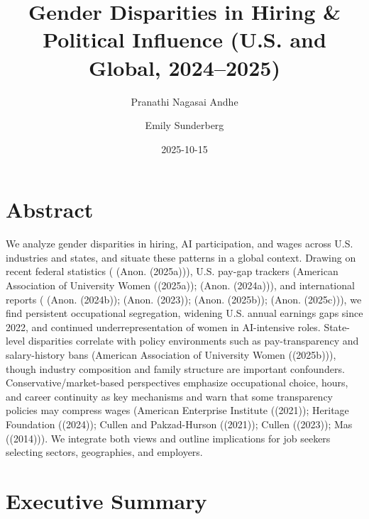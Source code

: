 \documentclass[
  letterpaper,
  DIV=11,
  numbers=noendperiod]{scrartcl}
\title{Gender Disparities in Hiring \& Political Influence (U.S. and
Global, 2024--2025)}
\author{Pranathi Nagasai Andhe \and Emily Sunderberg}
\date{2025-10-15}
\renewcommand*\contentsname{Table of contents}
\newcommand\contentsname{Table of contents}
\begin{document}
\maketitle

\renewcommand*\contentsname{Table of contents}
{
\hypersetup{linkcolor=}
\setcounter{tocdepth}{3}
\tableofcontents
}
\section{Abstract}\label{abstract}

We analyze gender disparities in hiring, AI participation, and wages
across U.S. industries and states, and situate these patterns in a
global context. Drawing on recent federal statistics ( (Anon. (2025a))),
U.S. pay-gap trackers (American Association of University Women
((2025a)); (Anon. (2024a))), and international reports ( (Anon.
(2024b)); (Anon. (2023)); (Anon. (2025b)); (Anon. (2025c))), we find
persistent occupational segregation, widening U.S. annual earnings gaps
since 2022, and continued underrepresentation of women in AI-intensive
roles. State-level disparities correlate with policy environments such
as pay-transparency and salary-history bans (American Association of
University Women ((2025b))), though industry composition and family
structure are important confounders. Conservative/market-based
perspectives emphasize occupational choice, hours, and career continuity
as key mechanisms and warn that some transparency policies may compress
wages (American Enterprise Institute ((2021)); Heritage Foundation
((2024)); Cullen and Pakzad-Hurson ((2021)); Cullen ((2023)); Mas
((2014))). We integrate both views and outline implications for job
seekers selecting sectors, geographies, and employers.

\section{Executive Summary}\label{executive-summary}
\end{document}
